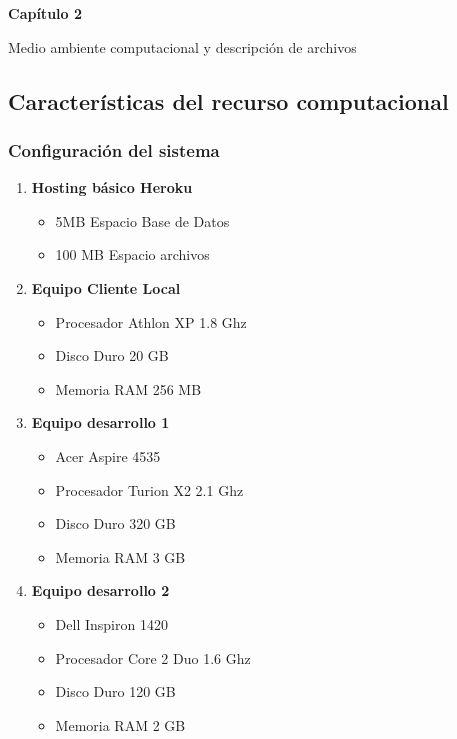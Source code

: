 \documentclass{beamer}
\begin{document}
\begin{frame}
\textbf{Capítulo 2}

\mbox{}

Medio ambiente computacional y descripción de archivos
\end{frame}

\subsection{Características del recurso computacional}

\begin{frame}
\frametitle{Configuración del sistema}

\begin{enumerate}
\item \textbf{Hosting básico Heroku}
\begin{itemize}
\pause
\item 5MB Espacio Base de Datos
\item 100 MB Espacio archivos\pause
\end{itemize}

\item \textbf{Equipo Cliente Local}
\begin{itemize}
\item Procesador Athlon XP 1.8 Ghz
\item Disco Duro 20 GB
\item Memoria RAM 256 MB \pause
\end{itemize}

\item \textbf{Equipo desarrollo 1}
\begin{itemize}
\item Acer Aspire 4535
\item Procesador Turion X2 2.1 Ghz
\item Disco Duro 320 GB
\item Memoria RAM 3 GB \pause
\end{itemize}

\item \textbf{Equipo desarrollo 2}
\begin{itemize}
\item Dell Inspiron 1420
\item Procesador Core 2 Duo 1.6 Ghz
\item Disco Duro 120 GB
\item Memoria RAM 2 GB
\end{itemize}

\end{enumerate}

\end{frame}
\end{document}
